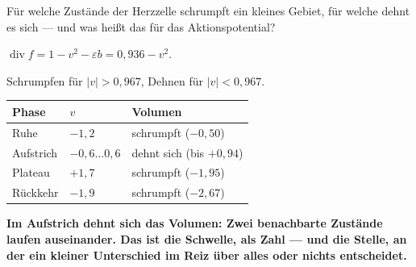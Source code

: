 \begin{aufgabe}
Für welche Zustände der Herzzelle schrumpft ein kleines Gebiet, für welche dehnt es sich --- und was heißt das für das Aktionspotential?

\loesung
{}
$\operatorname{div} f = 1 - v^{2} - \varepsilon b = 0{,}936 - v^{2}$.

Schrumpfen für $|v| > 0{,}967$, Dehnen für $|v| < 0{,}967$.

\begin{center}
{\small
\renewcommand{\arraystretch}{1.48}
\begin{tabular}{@{}P{2.6cm}P{2.4cm}P{3.4cm}@{}}
\toprule
\textbf{Phase} & $v$ & \textbf{Volumen}\\
\midrule
Ruhe & $-1{,}2$ & schrumpft ($-0{,}50$)\\
Aufstrich & $-0{,}6 \ldots 0{,}6$ & dehnt sich (bis $+0{,}94$)\\
Plateau & $+1{,}7$ & schrumpft ($-1{,}95$)\\
Rückkehr & $-1{,}9$ & schrumpft ($-2{,}67$)\\
\bottomrule
\end{tabular}}
\end{center}

\begin{center}
\begin{minipage}{0.9\textwidth}
\textbf{Im Aufstrich dehnt sich das Volumen: Zwei benachbarte Zustände laufen auseinander. Das ist die Schwelle, als Zahl --- und die Stelle, an der ein kleiner Unterschied im Reiz über alles oder nichts entscheidet.}
\end{minipage}
\end{center}

\begin{center}
\begin{minipage}{0.88\textwidth}
\end{minipage}
\end{center}
\end{aufgabe}

